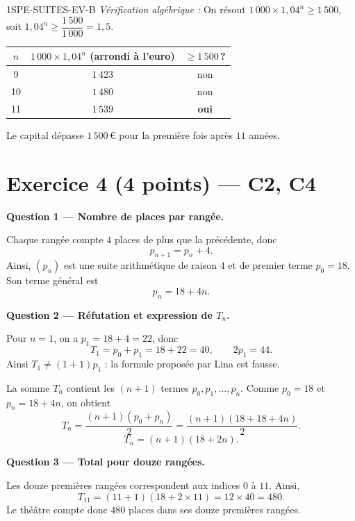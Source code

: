 \begin{corrige}{1SPE-SUITES-EV-B}
\textit{Vérification algébrique :} On résout $1\,000 \times 1{,}04^n \geq 1\,500$, soit $1{,}04^n \geq \dfrac{1\,500}{1\,000} = 1{,}5$.

\begin{center}
\begin{tabular}{c|c|c}
$n$ & $1\,000 \times 1{,}04^n$ (arrondi à l'euro) & $\geq 1\,500$\,? \\
\hline
9  & $1\,423$ & non \\
10 & $1\,480$ & non \\
11 & $1\,539$ & \textbf{oui} \\
\end{tabular}
\end{center}

Le capital dépasse $1\,500$\,€ pour la première fois après $\boxed{11}$ années. \checkmark

\section*{Exercice 4 \hfill (4 points) — C2, C4}


\bigskip
\textbf{Question 1 — Nombre de places par rangée.}


Chaque rangée compte $4$ places de plus que la précédente, donc
\[
  p_{n+1}=p_n+4.
\]
Ainsi, $(p_n)$ est une suite arithmétique de raison $4$ et de premier terme
$p_0=18$. Son terme général est
\[
  \boxed{p_n=18+4n}.
\]

\medskip
\textbf{Question 2 — Réfutation et expression de $T_n$.}

Pour $n=1$, on a $p_1=18+4=22$, donc
\[
  T_1=p_0+p_1=18+22=40,
  \qquad 2p_1=44.
\]
Ainsi $T_1\neq(1+1)p_1$ : la formule proposée par Lina est fausse.


La somme $T_n$ contient les $(n+1)$ termes $p_0,p_1,\ldots,p_n$. Comme
$p_0=18$ et $p_n=18+4n$, on obtient
\[
  T_n=\frac{(n+1)(p_0+p_n)}{2}
  =\frac{(n+1)(18+18+4n)}{2}.
\]
\[
  \boxed{T_n=(n+1)(18+2n)}.
\]

\medskip
\textbf{Question 3 — Total pour douze rangées.}

Les douze premières rangées correspondent aux indices $0$ à $11$. Ainsi,
\[
  T_{11}=(11+1)(18+2\times11)=12\times40=480.
\]
Le théâtre compte donc $\boxed{480\text{ places}}$ dans ses douze premières
rangées.

\end{corrige}
